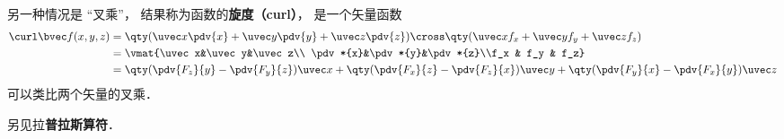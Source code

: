 另一种情况是 “叉乘”， 结果称为函数的\textbf{旋度（curl）}， 是一个矢量函数
\begin{equation}
\begin{aligned}
\curl \bvec f(x, y, z) &= \qty(\uvec x \pdv{x} + \uvec y \pdv{y} + \uvec z \pdv{z}) \cross \qty(\uvec x f_x + \uvec y f_y + \uvec z f_z)\\
&= \vmat{\uvec x&\uvec y&\uvec z\\ \pdv*{x}&\pdv*{y}&\pdv*{z}\\f_x & f_y & f_z}\\
&= \qty(\pdv{F_z}{y} - \pdv{F_y}{z})\uvec x + \qty(\pdv{F_x}{z} - \pdv{F_z}{x})\uvec y + \qty(\pdv{F_y}{x} - \pdv{F_x}{y})\uvec z
\end{aligned}
\end{equation}
可以类比两个矢量的叉乘．

另见拉\textbf{普拉斯算符}．
